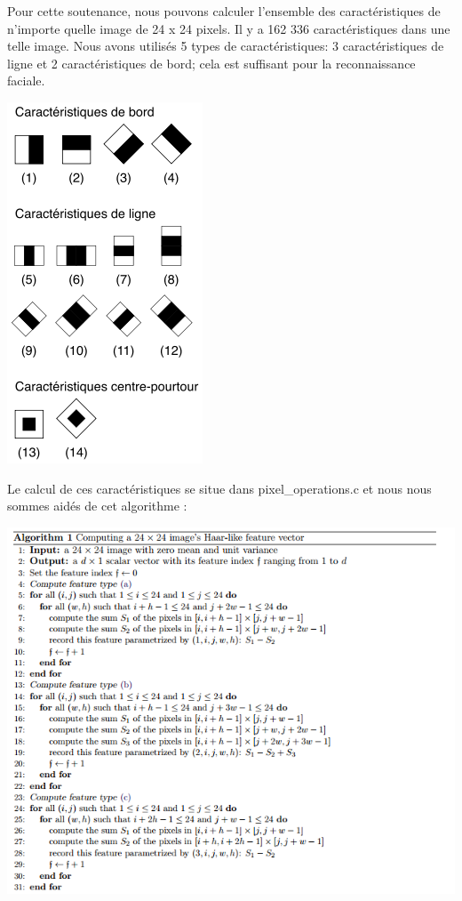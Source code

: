 \documentclass[12pt,a4paper]{article}
\begin{document}
Pour cette soutenance, nous pouvons calculer l'ensemble des caractéristiques de n'importe quelle image de 24 x 24 pixels. Il y a 162 336 caractéristiques dans une telle image. Nous avons utilisés 5 types de caractéristiques: 3 caractéristiques de ligne et 2 caractéristiques de bord; cela est suffisant pour la reconnaissance faciale.

\begin{center}
\includegraphics[scale=.7]{Pictures/caracteristiques.png}
\end{center}

\newpage
Le calcul de ces caractéristiques se situe dans pixel\_operations.c et nous nous sommes aidés de cet algorithme :
\newline
\vspace{0.8cm}
\begin{center}
\includegraphics[scale=.7]{Pictures/ipol.png}
\end{center}
\end{document}
